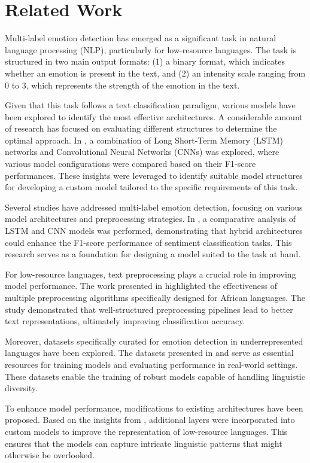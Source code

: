 \section{Related Work}
Multi-label emotion detection has emerged as a significant task in natural language processing (NLP), particularly for low-resource languages. The task is structured in two main output formats: (1) a binary format, which indicates whether an emotion is present in the text, and (2) an intensity scale ranging from 0 to 3, which represents the strength of the emotion in the text.

Given that this task follows a text classification paradigm, various models have been explored to identify the most effective architectures. A considerable amount of research has focused on evaluating different structures to determine the optimal approach. In \cite{wang2016dimensional}, a combination of Long Short-Term Memory (LSTM) networks and Convolutional Neural Networks (CNNs) was explored, where various model configurations were compared based on their F1-score performances. These insights were leveraged to identify suitable model structures for developing a custom model tailored to the specific requirements of this task.

Several studies have addressed multi-label emotion detection, focusing on various model architectures and preprocessing strategies. In \cite{wang2016dimensional}, a comparative analysis of LSTM and CNN models was performed, demonstrating that hybrid architectures could enhance the F1-score performance of sentiment classification tasks. This research serves as a foundation for designing a model suited to the task at hand.

For low-resource languages, text preprocessing plays a crucial role in improving model performance. The work presented in \cite{muhammad2023semeval} highlighted the effectiveness of multiple preprocessing algorithms specifically designed for African languages. The study demonstrated that well-structured preprocessing pipelines lead to better text representations, ultimately improving classification accuracy.

Moreover, datasets specifically curated for emotion detection in underrepresented languages have been explored. The datasets presented in \cite{muhammad2025brighterbridginggaphumanannotated} and \cite{belay-etal-2025-evaluating} serve as essential resources for training models and evaluating performance in real-world settings. These datasets enable the training of robust models capable of handling linguistic diversity.

To enhance model performance, modifications to existing architectures have been proposed. Based on the insights from \cite{wang2016dimensional}, additional layers were incorporated into custom models to improve the representation of low-resource languages. This ensures that the models can capture intricate linguistic patterns that might otherwise be overlooked.